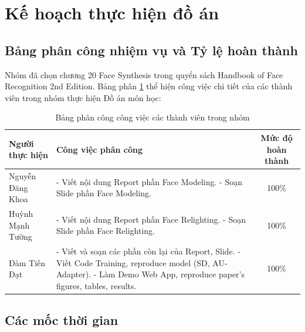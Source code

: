 \section{Kế hoạch thực hiện đồ án}

\subsection{Bảng phân công nhiệm vụ và Tỷ lệ hoàn thành}
Nhóm đã chọn chương 20 Face Synthesis trong quyển sách Handbook of Face Recognition 2nd Edition. Bảng phân \ref{tab:work_assignment} thể hiện công việc chi tiết của các thành viên trong nhóm thực hiện Đồ án môn học:

\begin{table}[H]
    \centering
    \caption{Bảng phân công công việc các thành viên trong nhóm}
    \label{tab:work_assignment}
    \begin{tabular}{lp{8.5cm}c}
        \toprule
        \textbf{Người thực hiện} & \textbf{Công việc phân công}                                                                                                                                                                 & \textbf{Mức độ hoàn thành} \\ \midrule
        Nguyễn Đăng Khoa         & - Viết nội dung Report phần Face Modeling. \newline - Soạn Slide phần Face Modeling.                                                                                                         & 100\%                      \\
        Huỳnh Mạnh Tường         & - Viết nội dung Report phần Face Relighting. \newline - Soạn Slide phần Face Relighting.                                                                                                     & 100\%                      \\
        Đàm Tiến Đạt             & - Viết và soạn các phần còn lại của Report, Slide. \newline - Viết Code Training, reproduce model (SD, AU-Adapter). \newline - Làm Demo Web App, reproduce paper's figures, tables, results. & 100\%                      \\ \bottomrule
    \end{tabular}
\end{table}

\subsection{Các mốc thời gian}

